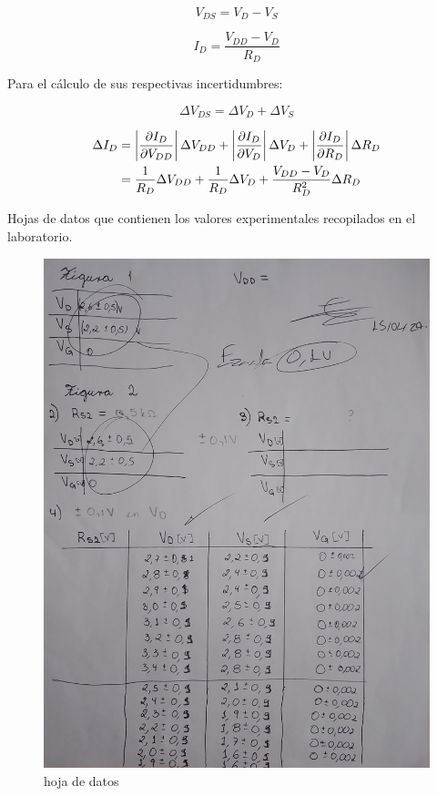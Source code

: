 \documentclass[12pt, a4paper]{article}
\begin{document}
    \begin{equation}
        V_{DS} = V_D - V_S
        \label{Qeq1}
    \end{equation}

    \begin{equation}
        I_D = \frac{V_{DD} - V_D}{R_D}
        \label{Qeq2}
    \end{equation}

    Para el cálculo de sus respectivas incertidumbres:

    \begin{equation}
        \Delta V_{DS} = \Delta V_D + \Delta V_S
        \label{Qeq3}
    \end{equation}

    \begin{equation}
        \begin{split}
            \Delta I_D & = \left | \frac{\partial I_D}{\partial V_{DD}} \right | \Delta V_{DD} + \left | \frac{\partial I_D}{\partial V_D} \right | \Delta V_D + \left | \frac{\partial I_D}{\partial R_D} \right | \Delta R_D \\
            & = {1 \over R_D} \Delta V_{DD} + {1 \over R_D} \Delta V_D + \frac{V_{DD}-V_D}{R_D^2} \Delta R_D
        \end{split}
        \label{Qeq4}
    \end{equation}


    \newpage

    Hojas de datos que contienen los valores experimentales recopilados en el laboratorio.

    \begin{figure}[h!]
        \centering
        \includegraphics[height=10cm\textwidth]{hd5.jpg}
        \caption{hoja de datos}
        \label{fig:hd5}
    \end{figure}
\end{document}
